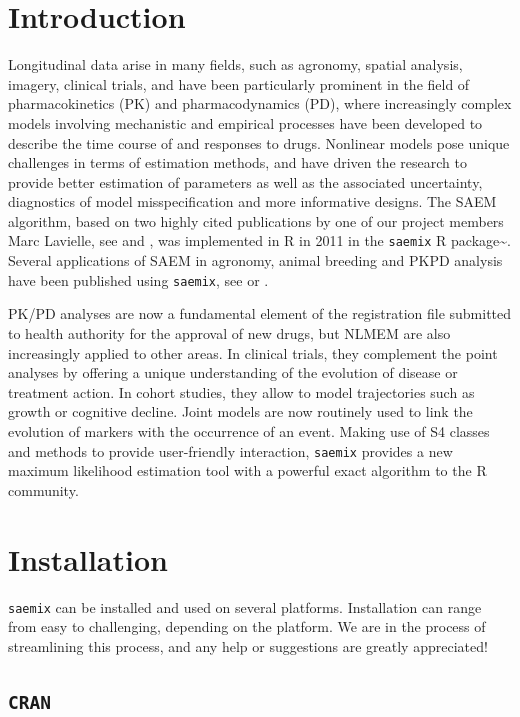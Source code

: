 \documentclass[]{book}
\begin{document}
\chapter{Introduction}\label{intro}

Longitudinal data arise in many fields, such as agronomy, spatial
analysis, imagery, clinical trials, and have been particularly prominent
in the field of pharmacokinetics (PK) and pharmacodynamics (PD), where
increasingly complex models involving mechanistic and empirical
processes have been developed to describe the time course of and
responses to drugs. Nonlinear models pose unique challenges in terms of
estimation methods, and have driven the research to provide better
estimation of parameters as well as the associated uncertainty,
diagnostics of model misspecification and more informative designs. The
SAEM algorithm, based on two highly cited publications by one of our
project members Marc Lavielle, see \citep{lavielle} and \citep{kuhn},
was implemented in R in 2011 in the \texttt{saemix} R
package\textasciitilde{}\citep{saemix2017}. Several applications of SAEM
in agronomy, animal breeding and PKPD analysis have been published using
\texttt{saemix}, see \citep{karimi2020f} or \citep{samson2006extension}.

PK/PD analyses are now a fundamental element of the registration file
submitted to health authority for the approval of new drugs, but NLMEM
are also increasingly applied to other areas. In clinical trials, they
complement the point analyses by offering a unique understanding of the
evolution of disease or treatment action. In cohort studies, they allow
to model trajectories such as growth or cognitive decline. Joint models
are now routinely used to link the evolution of markers with the
occurrence of an event. Making use of S4 classes and methods to provide
user-friendly interaction, \texttt{saemix} provides a new maximum
likelihood estimation tool with a powerful exact algorithm to the R
community.

\chapter{Installation}\label{install}

\texttt{saemix} can be installed and used on several platforms.
Installation can range from easy to challenging, depending on the
platform. We are in the process of streamlining this process, and any
help or suggestions are greatly appreciated!

\section{\texorpdfstring{\texttt{CRAN}}{CRAN}}\label{cran}
\end{document}
